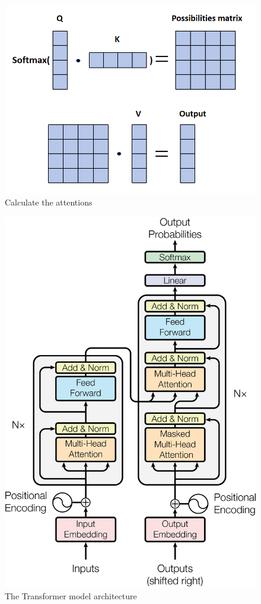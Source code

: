   \begin{figure}
    \centering
    \includegraphics[width=0.6\linewidth]{example_images/AttenCalculation}
    \caption{Calculate the attentions}
    \label{Calculate the attentions}
  \end{figure}
  \begin{figure}
    \centering
    \includegraphics[width=0.6\linewidth]{example_images/transformer}
    \caption{The Transformer model architecture\cite{NIPS2017_3f5ee243}}
    \label{The Transformer model architecture}
  \end{figure}
